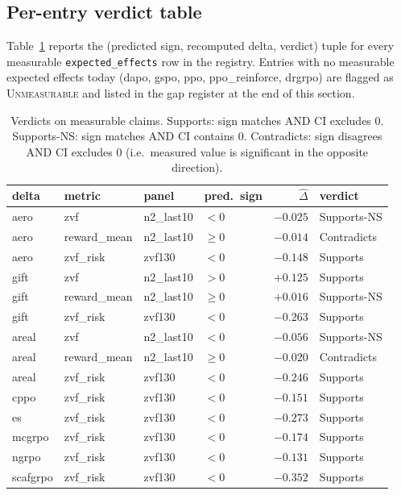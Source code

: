 \subsection{Per-entry verdict table}
Table~\ref{tab:p6-iter190-verdicts} reports the (predicted sign,
recomputed delta, verdict) tuple for every measurable
\texttt{expected\_effects} row in the registry. Entries with no
measurable expected effects today (dapo, gspo, ppo, ppo\_reinforce,
drgrpo) are flagged as \textsc{Unmeasurable} and listed in the gap
register at the end of this section.

\begin{table}[h]
\centering
\small
\begin{tabular}{llllrl}
\toprule
delta & metric & panel & pred.\ sign & $\hat\Delta$ & verdict \\
\midrule
aero  & zvf          & n2\_last10 & $<$0  & $-0.025$ & Supports-NS \\
aero  & reward\_mean & n2\_last10 & $\ge$0 & $-0.014$ & Contradicts \\
aero  & zvf\_risk    & zvf130     & $<$0  & $-0.148$ & Supports \\
\midrule
gift  & zvf          & n2\_last10 & $>$0  & $+0.125$ & Supports \\
gift  & reward\_mean & n2\_last10 & $\ge$0 & $+0.016$ & Supports-NS \\
gift  & zvf\_risk    & zvf130     & $<$0  & $-0.263$ & Supports \\
\midrule
areal & zvf          & n2\_last10 & $<$0  & $-0.056$ & Supports-NS \\
areal & reward\_mean & n2\_last10 & $\ge$0 & $-0.020$ & Contradicts \\
areal & zvf\_risk    & zvf130     & $<$0  & $-0.246$ & Supports \\
\midrule
cppo  & zvf\_risk    & zvf130     & $<$0  & $-0.151$ &Supports \\
es    & zvf\_risk    & zvf130     & $<$0  & $-0.273$ & Supports \\
mcgrpo& zvf\_risk    & zvf130     & $<$0  & $-0.174$ & Supports \\
ngrpo & zvf\_risk    & zvf130     & $<$0  & $-0.131$ & Supports \\
scafgrpo& zvf\_risk  & zvf130     & $<$0  & $-0.352$ & Supports \\
\bottomrule
\end{tabular}
\caption{Verdicts on measurable claims. Supports: sign matches AND
CI excludes 0. Supports-NS: sign matches AND CI contains 0.
Contradicts: sign disagrees AND CI excludes 0 (i.e.\ measured value is
significant in the opposite direction).}
\label{tab:p6-iter190-verdicts}
\end{table}


